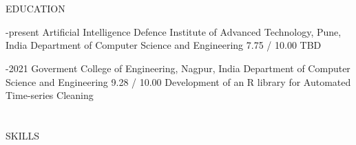 \documentclass{my_cv}
\begin{document}


\section{\faGraduationCap}{EDUCATION}

\begin{multicols}{2}

{\faCalendar {}-present}%
{Artificial Intelligence}%
{Defence Institute of Advanced Technology, Pune, India} %
{Department of Computer Science and Engineering}%
{7.75 / 10.00}%
{TBD}

\columnbreak

{\faCalendar {}-2021}%
{}%
{Goverment College of Engineering, Nagpur, India} %
{Department of Computer Science and Engineering}%
{9.28 / 10.00} %
{Development of an R library for Automated Time-series Cleaning}

\end{multicols}





\section{\faList}{SKILLS}
\end{document}
